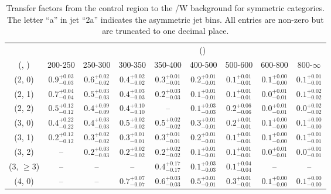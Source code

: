 \begin{table}[h!]
\tiny
\centering
\caption{Transfer factors from the \mj control region to the \ttbar/W background for symmetric categories. The letter ``a'' in jet \eg ``2a''  indicates the asymmetric jet bins. All entries are non-zero but are truncated to one decimal place.\label{tab:tf_mu_ttw_sym}}
\begin{tabular}
{ccccccccc}
	\hline\hline
&	& \multicolumn{8}{c}{\scalht (\gev)} \\ 
	 (\njet,  \nb) & 200-250 & 250-300 & 300-350 & 350-400 & 400-500 & 500-600 & 600-800 & 800-$\infty$ \\ [0.8ex] 
\hline
	(2, 0) & $0.9^{+ 0.03 }_{- 0.03 }$ & $0.6^{+ 0.02 }_{- 0.02 }$ & $0.4^{+ 0.02 }_{- 0.02 }$ & $0.3^{+ 0.01 }_{- 0.01 }$ & $0.2^{+ 0.01 }_{- 0.01 }$ & $0.1^{+ 0.01 }_{- 0.01 }$ & $0.1^{+ 0.00 }_{- 0.00 }$ & $0.1^{+ 0.01 }_{- 0.01 }$ \\[0.5ex] 
	(2, 1) & $0.7^{+ 0.04 }_{- 0.04 }$ & $0.5^{+ 0.03 }_{- 0.03 }$ & $0.4^{+ 0.03 }_{- 0.03 }$ & $0.2^{+ 0.03 }_{- 0.03 }$ & $0.1^{+ 0.01 }_{- 0.01 }$ & $0.1^{+ 0.01 }_{- 0.01 }$ & $0.0^{+ 0.01 }_{- 0.01 }$ & $0.1^{+ 0.02 }_{- 0.02 }$ \\[0.5ex] 
	(2, 2) & $0.5^{+ 0.12 }_{- 0.12 }$ & $0.4^{+ 0.09 }_{- 0.09 }$ & $0.4^{+ 0.10 }_{- 0.10 }$ & -- & $0.1^{+ 0.03 }_{- 0.03 }$ & $0.2^{+ 0.06 }_{- 0.06 }$ & $0.0^{+ 0.01 }_{- 0.01 }$ & $0.0^{+ 0.02 }_{- 0.02 }$ \\[0.5ex] 
	(3, 0) & $0.4^{+ 0.22 }_{- 0.22 }$ & $0.4^{+ 0.03 }_{- 0.03 }$ & $0.5^{+ 0.02 }_{- 0.02 }$ & $0.5^{+ 0.02 }_{- 0.02 }$ & $0.3^{+ 0.01 }_{- 0.01 }$ & $0.2^{+ 0.01 }_{- 0.01 }$ & $0.1^{+ 0.00 }_{- 0.00 }$ & $0.1^{+ 0.00 }_{- 0.00 }$ \\[0.5ex] 
	(3, 1) & $0.2^{+ 0.12 }_{- 0.12 }$ & $0.3^{+ 0.02 }_{- 0.02 }$ & $0.3^{+ 0.01 }_{- 0.01 }$ & $0.3^{+ 0.01 }_{- 0.01 }$ & $0.2^{+ 0.01 }_{- 0.01 }$ & $0.1^{+ 0.01 }_{- 0.01 }$ & $0.1^{+ 0.00 }_{- 0.00 }$ & $0.1^{+ 0.01 }_{- 0.01 }$ \\[0.5ex] 
	(3, 2) & -- & $0.2^{+ 0.03 }_{- 0.03 }$ & $0.2^{+ 0.02 }_{- 0.02 }$ & $0.2^{+ 0.02 }_{- 0.02 }$ & $0.1^{+ 0.01 }_{- 0.01 }$ & $0.1^{+ 0.01 }_{- 0.01 }$ & $0.0^{+ 0.01 }_{- 0.01 }$ & $0.0^{+ 0.01 }_{- 0.01 }$ \\[0.5ex] 
	(3, $\ge3$) & -- & -- & -- & $0.4^{+ 0.17 }_{- 0.17 }$ & $0.1^{+ 0.03 }_{- 0.03 }$ & $0.1^{+ 0.04 }_{- 0.04 }$ & -- & -- \\[0.5ex] 
	(4, 0) & -- & -- & $0.7^{+ 0.07 }_{- 0.07 }$ & $0.6^{+ 0.03 }_{- 0.03 }$ & $0.5^{+ 0.01 }_{- 0.01 }$ & $0.3^{+ 0.01 }_{- 0.01 }$ & $0.1^{+ 0.00 }_{- 0.00 }$ & $0.1^{+ 0.00 }_{- 0.00 }$ \\[0.5ex] 

\end{tabular}
\end{table}
